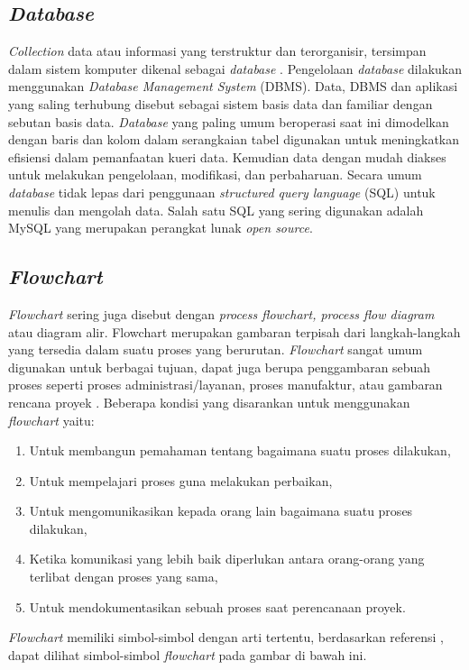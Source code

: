 \begin{flushleft}
\begin{justify}
        \subsection{\textit{Database}}
            \textit{Collection} data atau informasi yang terstruktur dan terorganisir, 
            tersimpan dalam sistem komputer dikenal sebagai \emph{database} \cite{Database}. 
            Pengelolaan \textit{database} dilakukan menggunakan \textit{Database Management System} (DBMS). 
            Data, DBMS dan aplikasi yang saling terhubung disebut sebagai sistem basis data dan familiar dengan 
            sebutan basis data. \textit{Database} yang paling umum beroperasi saat ini dimodelkan dengan 
            baris dan kolom dalam serangkaian tabel digunakan untuk meningkatkan efisiensi dalam pemanfaatan 
            kueri data. Kemudian data dengan mudah diakses untuk melakukan pengelolaan, modifikasi, 
            dan perbaharuan. Secara umum \textit{database} tidak lepas dari penggunaan \textit{structured query language} (SQL) untuk menulis 
            dan mengolah data. Salah satu SQL yang sering digunakan adalah MySQL yang merupakan perangkat lunak \textit{open source}.
            \\
        \subsection{\textit{Flowchart}}
            \textit{Flowchart} sering juga disebut dengan \textit{process flowchart, process flow diagram} atau diagram alir. Flowchart merupakan gambaran terpisah dari langkah-langkah yang tersedia dalam 
            suatu proses yang berurutan. \textit{Flowchart} sangat umum digunakan untuk berbagai tujuan,
            dapat juga berupa penggambaran sebuah proses seperti proses administrasi/layanan, proses manufaktur, atau gambaran rencana proyek \cite{Flowchart}.
            Beberapa kondisi yang disarankan untuk menggunakan \textit{flowchart} yaitu:
            \begin{enumerate}
                \item Untuk membangun pemahaman tentang bagaimana suatu proses dilakukan,
                \item Untuk mempelajari proses guna melakukan perbaikan,
                \item Untuk mengomunikasikan kepada orang lain bagaimana suatu proses dilakukan,
                \item Ketika komunikasi yang lebih baik diperlukan antara orang-orang yang terlibat dengan proses yang sama,
                \item Untuk mendokumentasikan sebuah proses saat perencanaan proyek.
            \end{enumerate} 
            \noindent \textit{Flowchart} memiliki simbol-simbol dengan arti tertentu, berdasarkan referensi \cite{gambar fc}, dapat dilihat simbol-simbol \emph{flowchart} pada gambar di bawah ini.
     

\end{justify}
\end{flushleft}

